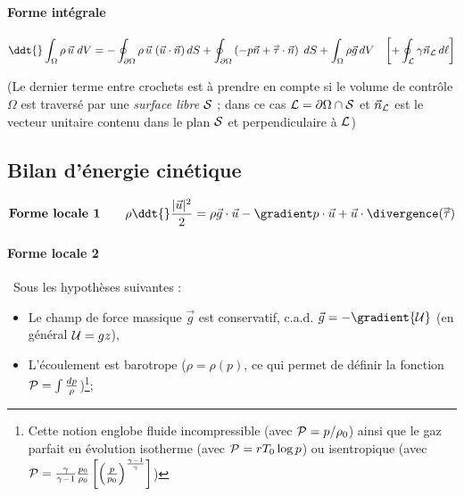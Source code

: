 \paragraph{Forme intégrale}
	\begin{equation}
		\ddt{} \int_{\Omega} \rho \, \vec{u} \; dV 
		=
		- \oint_{\partial \Omega} \rho \, \vec{u}\; (\vec{u}\cdot \vec{n}) \, dS
		+ \oint_{\partial \Omega} \left( -p \vec{n} + \mytensor{\tau} \cdot \vec{n}\right) \; dS
		+ \int_{\Omega} \rho \vec{g} \, dV 
		\quad { \left[ + \oint_{\cal L} \gamma \vec{n}_{\cal L}  \, d\ell \right]}
		\label{eq:bilan_global_eulerien_qdm}
	\end{equation}
	
{\small (Le dernier terme entre crochets est à prendre en compte si le volume de contrôle $\Omega$ est traversé par une {\em surface libre} ${\cal S}$ ; dans ce cas  $ {\cal L} = {\partial \Omega} \cap \cal S$ et $\vec{n}_{\cal L} $ est le vecteur unitaire contenu dans le plan ${\cal S}$ et perpendiculaire à ${\cal L}$)}

\subsection{Bilan d'énergie cinétique}

\begin{equation}
\mbox{\bf Forme locale 1} \qquad  
		\rho \ddt{} \frac{ |\vec{u}|^2}{2} 
		= 
		\rho \vec{g} \cdot \vec{u}  - \gradient p \cdot {\vec u} + \vec{u} \cdot \divergence ( \mytensor{\tau} )
\end{equation}

\paragraph{Forme locale 2}

$\,$
Sous les hypothèses suivantes :
\begin{itemize}
\item 
Le champ de force massique $\vec g$ est conservatif, c.a.d. 
$\vec g = -\gradient {\cal U}$ (en général ${\cal U}= g z$), \item  L'écoulement est barotrope ($\rho=\rho(p)$,  ce qui permet de définir la  fonction  ${\cal P} = \int \frac{d p}{\rho}$)\footnote{Cette notion englobe fluide incompressible (avec ${\cal P} = p/ \rho_0$)  ainsi que le gaz parfait en évolution isotherme (avec ${\cal P} = r T_0  \log p $) ou isentropique
 (avec ${\cal P} = \frac{\gamma}{\gamma-1} \frac{p_0}{\rho_0} 
 \left[ \left(\frac{p}{p_0}\right)^{\frac{\gamma-1}{\gamma}} \right] $)
};

\end{itemize}

